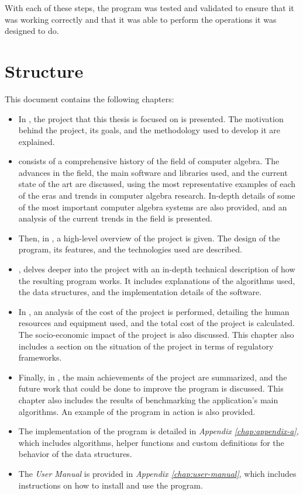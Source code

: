 With each of these steps, the program was tested and validated to ensure that it was working correctly and that it was able to perform the operations it was designed to do.

\section{Structure}\label{sec:structure}
This document contains the following chapters:
\begin{itemize}
  \item In , the project that this thesis is focused on is presented. The motivation behind the project, its goals, and the methodology used to develop it are explained.
  \item {} consists of a comprehensive history of the field of computer algebra. The advances in the field, the main software and libraries used, and the current state of the art are discussed, using the most representative examples of each of the eras and trends in computer algebra research. In-depth details of some of the most important computer algebra systems are also provided, and an analysis of the current trends in the field is presented.
  \item Then, in , a high-level overview of the project is given. The design of the program, its features, and the technologies used are described.
  \item {}, delves deeper into the project with an in-depth technical description of how the resulting program works. It includes explanations of the algorithms used, the data structures, and the implementation details of the software.
  \item In , an analysis of the cost of the project is performed, detailing the human resources and equipment used, and the total cost of the project is calculated. The socio-economic impact of the project is also discussed. This chapter also includes a section on the situation of the project in terms of regulatory frameworks.
  \item Finally, in , the main achievements of the project are summarized, and the future work that could be done to improve the program is discussed. This chapter also includes the results of benchmarking the application's main algorithms. An example of the program in action is also provided.
  \item The implementation of the program is detailed in \textit{Appendix \ref{chap:appendix-a}}, which includes algorithms, helper functions and custom definitions for the behavior of the data structures.
  \item The \textit{User Manual} is provided in \textit{Appendix \ref{chap:user-manual}}, which includes instructions on how to install and use the program.
\end{itemize}

